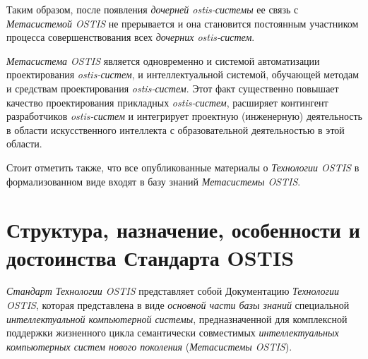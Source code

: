 Таким образом, после появления \textit{дочерней ostis-системы} ее связь с \textit{Метасистемой OSTIS} не прерывается и она становится постоянным участником процесса совершенствования всех \textit{дочерних ostis-систем}.

\textit{Метасистема OSTIS} является одновременно и системой автоматизации проектирования \textit{ostis-систем}, и интеллектуальной системой, обучающей методам и средствам проектирования \textit{ostis-систем}. Этот факт существенно повышает качество проектирования прикладных \textit{ostis-систем}, расширяет контингент разработчиков \textit{ostis-систем} и интегрирует проектную (инженерную) деятельность в области искусственного интеллекта с образовательной деятельностью в этой области.

Стоит отметить также, что все опубликованные материалы о \textit{Технологии OSTIS} в формализованном виде входят в базу знаний \textit{Метасистемы OSTIS}.


\section{Структура, назначение, особенности и достоинства Стандарта OSTIS}
\label{sec_standard}

\textit{Стандарт Технологии OSTIS} представляет собой Документацию \textit{Технологии OSTIS}, которая представлена в виде \textit{основной части базы знаний} специальной \textit{интеллектуальной компьютерной системы}, предназначенной для комплексной поддержки жизненного цикла семантически совместимых \textit{интеллектуальных компьютерных систем нового поколения} (\textit{Метасистемы OSTIS}). 

